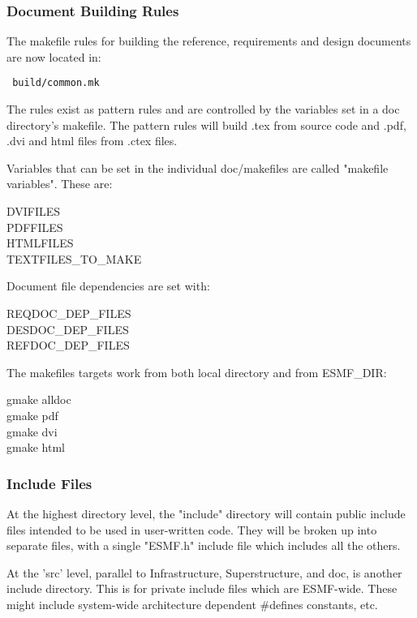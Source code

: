 \subsubsection{Document Building Rules} 
The makefile rules for building the
reference, requirements and design documents are now located in:
\begin{verbatim} build/common.mk \end{verbatim} 
The rules exist
as pattern rules and are controlled by the variables set in a doc
directory's makefile.  The pattern rules will build .tex  from source code
and .pdf, .dvi and html files from .ctex files.

Variables that can be set in the individual doc/makefiles are called
"makefile variables".  These are: 
\begin{description} 
\item [DVIFILES]
\item [PDFFILES] 
\item [HTMLFILES] 
\item [TEXTFILES\_TO\_MAKE]
\end{description}

Document file dependencies are set with: 
\begin{description} 
\item [REQDOC\_DEP\_FILES] 
\item [DESDOC\_DEP\_FILES] 
\item [REFDOC\_DEP\_FILES]
\end{description}

The makefiles targets work from both local directory and from ESMF\_DIR:
\begin{description} 
\item [gmake alldoc] 
\item [gmake pdf] 
\item [gmake dvi] 
\item [gmake html] 
\end{description}


\subsubsection{Include Files} 
At the highest directory level, the "include"
directory will contain public include files intended to be used in
user-written code.  They will be broken up into separate files, with a
single "ESMF.h" include file which includes all the others.

At the 'src' level, parallel to Infrastructure, Superstructure, and doc,
is another include directory.  This is for private include files which are
ESMF-wide.  These might include system-wide architecture dependent
\#defines constants, etc.

